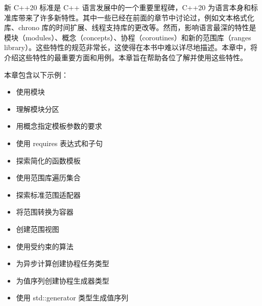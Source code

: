 新 C++20 标准是 C++ 语言发展中的一个重要里程碑，C++20 为语言本身和标准库带来了许多新特性。其中一些已经在前面的章节中讨论过，例如文本格式化库、chrono 库的时间扩展、线程支持库的更改等。然而，影响语言最深的特性是模块（modules）、概念（concepts）、协程（coroutines）和新的范围库（ranges library）。这些特性的规范非常长，这使得在本书中难以详尽地描述。本章中，将介绍这些特性的最重要方面和用例。本章旨在帮助各位了解并使用这些特性。

本章包含以下示例：

\begin{itemize}
\item
使用模块

\item
理解模块分区

\item
用概念指定模板参数的要求

\item
使用 requires 表达式和子句

\item
探索简化的函数模板

\item
使用范围库遍历集合

\item
探索标准范围适配器

\item
将范围转换为容器

\item
创建范围视图

\item
使用受约束的算法

\item
为异步计算创建协程任务类型

\item
为值序列创建协程生成器类型

\item
使用 std::generator 类型生成值序列
\end{itemize}

